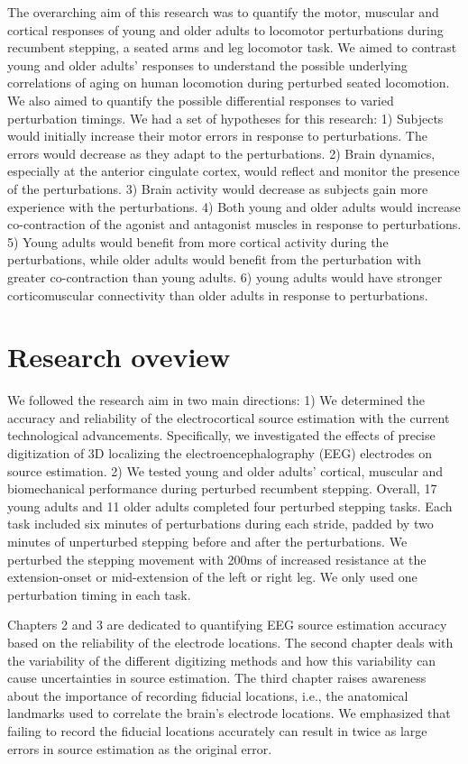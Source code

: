 \documentclass[../thesis_seyed.tex]{subfiles}
\begin{document}
The overarching aim of this research was to quantify the motor, muscular and cortical responses of young and older adults to locomotor perturbations during recumbent stepping, a seated arms and leg locomotor task. We aimed to contrast young and older adults' responses to understand the possible underlying correlations of aging on human locomotion during perturbed seated locomotion. We also aimed to quantify the possible differential responses to varied perturbation timings. We had a set of hypotheses for this research: 1) Subjects would initially increase their motor errors in response to perturbations. The errors would decrease as they adapt to the perturbations. 2) Brain dynamics, especially at the anterior cingulate cortex, would reflect and monitor the presence of the perturbations. 3) Brain activity would decrease as subjects gain more experience with the perturbations. 4) Both young and older adults would increase co-contraction of the agonist and antagonist muscles in response to perturbations. 5) Young adults would benefit from more cortical activity during the perturbations, while older adults would benefit from the perturbation with greater co-contraction than young adults. 6) young adults would have stronger corticomuscular connectivity than older adults in response to perturbations.

\section{Research oveview}
We followed the research aim in two main directions: 1) We determined the accuracy and reliability of the electrocortical source estimation with the current technological advancements. Specifically, we investigated the effects of precise digitization of 3D localizing the electroencephalography (EEG) electrodes on source estimation. 2) We tested young and older adults' cortical, muscular and biomechanical performance during perturbed recumbent stepping. Overall, 17 young adults and 11 older adults completed four perturbed stepping tasks. Each task included six minutes of perturbations during each stride, padded by two minutes of unperturbed stepping before and after the perturbations. We perturbed the stepping movement with 200ms of increased resistance at the extension-onset or mid-extension of the left or right leg. We only used one perturbation timing in each task.

Chapters 2 and 3 are dedicated to quantifying EEG source estimation accuracy based on the reliability of the electrode locations. The second chapter deals with the variability of the different digitizing methods and how this variability can cause uncertainties in source estimation. The third chapter raises awareness about the importance of recording fiducial locations, i.e., the anatomical landmarks used to correlate the brain's electrode locations. We emphasized that failing to record the fiducial locations accurately can result in twice as large errors in source estimation as the original error.
\end{document}
